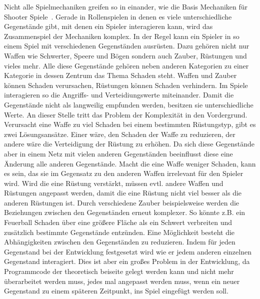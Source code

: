 Nicht alle Spielmechaniken greifen so in einander, wie die Basis Mechaniken für \glqq Shooter Spiele\grqq\ . Gerade in Rollenspielen in denen es viele unterschiedliche Gegenstände gibt, mit denen ein Spieler interagieren kann, wird das Zusammenspiel der Mechaniken komplex. In der Regel kann ein Spieler in so einem Spiel mit verschiedenen Gegenständen ausrüsten. Dazu gehören nicht nur Waffen wie Schwerter, Speere und Bögen sondern auch Zauber, Rüstungen und vieles mehr. Alle diese Gegenstände gehören neben anderen Kategorien zu einer Kategorie in dessen Zentrum das Thema Schaden steht. Waffen und Zauber können Schaden verursachen, Rüstungen können Schaden verhindern. Im Spiele interagieren so die Angriffs- und Verteidiungswerte miteinander. Damit die Gegenstände nicht als langweilig empfunden werden, besitzen sie unterschiedliche Werte. An dieser Stelle tritt das Problem der Komplexität in den Vordergrund. Verursacht eine Waffe zu viel Schaden bei einem bestimmten Rüstungstyp, gibt es zwei Lösungsansätze. Einer wäre, den Schaden der Waffe zu reduzieren, der andere wäre die Verteidigung der Rüstung zu erhöhen. Da sich diese Gegenstände aber in einem Netz mit vielen anderen Gegenständen beeinflusst diese eine Änderung alle anderen Gegenstände. Macht die eine Waffe weniger Schaden, kann es sein, das sie im Gegensatz zu den anderen Waffen irrelevant für den Spieler wird. Wird die eine Rüstung verstärkt, müssen evtl. andere Waffen und Rüstungen angepasst werden, damit die eine Rüstung nicht viel besser als die anderen Rüstungen ist. Durch verschiedene Zauber beispielsweise werden die Beziehungen zwischen den Gegenständen erneut komplexer. So könnte z.B. ein Feuerball Schaden über eine größere Fläche als ein Schwert verbreiten und zusätzlich bestimmte Gegenstände entzünden. Eine Möglichkeit besteht die Abhängigkeiten zwischen den Gegenständen zu reduzieren. Indem für jeden Gegenstand bei der Entwicklung festgesetzt wird wie er jedem anderen einzelnen Gegenstand interagiert. Dies ist aber ein großes Problem in der Entwicklung, da Programmcode der theoretisch beiseite gelegt werden kann und nicht mehr überarbeitet werden muss, jedes mal angepasst werden muss, wenn ein neuer Gegenstand zu einem späteren Zeitpunkt, ins Spiel eingefügt werden soll. \cite[S. 51 f.]{Adams:1515529}


